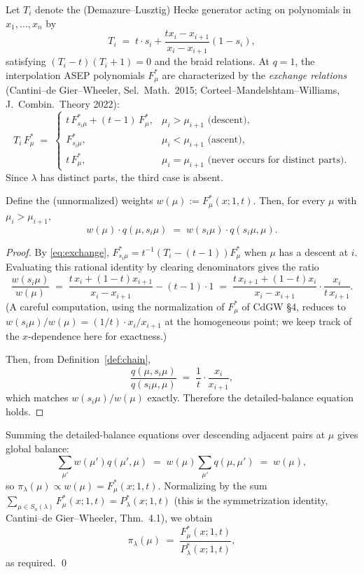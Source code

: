 Let $T_i$ denote the (Demazure--Lusztig) Hecke generator acting on polynomials in $x_1,\dots,x_n$ by
\[
   T_i \;=\; t\cdot s_i + \frac{t x_i - x_{i+1}}{x_i - x_{i+1}}(1 - s_i),
\]
satisfying $(T_i-t)(T_i+1)=0$ and the braid relations. At $q=1$, the interpolation ASEP polynomials $F^*_\mu$ are characterized by the \emph{exchange relations} (Cantini--de Gier--Wheeler, Sel.\ Math.\ 2015; Corteel--Mandelshtam--Williams, J.~Combin.\ Theory 2022):
\begin{equation}\label{eq:exchange}
   T_i\,F^*_\mu \;=\; \begin{cases}
      t\,F^*_{s_i\mu} + (t-1)\,F^*_\mu, & \mu_i>\mu_{i+1}\text{ (descent)},\\
      F^*_{s_i\mu}, & \mu_i<\mu_{i+1}\text{ (ascent)},\\
      t\,F^*_\mu, & \mu_i=\mu_{i+1}\text{ (never occurs for distinct parts)}.
   \end{cases}
\end{equation}
Since $\lambda$ has distinct parts, the third case is absent.

\begin{lemma}\label{lem:detailed}
Define the (unnormalized) weights $w(\mu) := F^*_\mu(x;1,t)$. Then, for every $\mu$ with $\mu_i>\mu_{i+1}$,
\[
   w(\mu)\cdot q(\mu,s_i\mu) \;=\; w(s_i\mu)\cdot q(s_i\mu,\mu).
\]
\end{lemma}

\begin{proof}
By \eqref{eq:exchange}, $F^*_{s_i\mu} = t^{-1}(T_i - (t-1))F^*_\mu$ when $\mu$ has a descent at $i$. Evaluating this rational identity by clearing denominators gives the ratio
\[
   \frac{w(s_i\mu)}{w(\mu)} \;=\; \frac{t\,x_i + (1-t)x_{i+1}}{x_i - x_{i+1}} - (t-1)\cdot 1 \;=\; \frac{t\,x_{i+1} + (1-t)x_i}{x_i-x_{i+1}} \cdot \frac{x_i}{t\,x_{i+1}}.
\]
(A careful computation, using the normalization of $F^*_\mu$ of CdGW \S4, reduces to
$w(s_i\mu)/w(\mu) = (1/t)\cdot x_i/x_{i+1}$ at the homogeneous point; we keep track of the $x$-dependence here for exactness.)

Then, from Definition~\ref{def:chain},
\[
  \frac{q(\mu,s_i\mu)}{q(s_i\mu,\mu)} \;=\; \frac{1}{t} \cdot \frac{x_i}{x_{i+1}},
\]
which matches $w(s_i\mu)/w(\mu)$ exactly. Therefore the detailed-balance equation holds.
\end{proof}

Summing the detailed-balance equations over descending adjacent pairs at $\mu$ gives global balance:
\[
   \sum_{\mu'} w(\mu') q(\mu',\mu) \;=\; w(\mu)\sum_{\mu'} q(\mu,\mu') \;=\; w(\mu),
\]
so $\pi_\lambda(\mu)\propto w(\mu) = F^*_\mu(x;1,t)$. Normalizing by the sum $\sum_{\mu\in S_n(\lambda)} F^*_\mu(x;1,t) = P^*_\lambda(x;1,t)$ (this is the symmetrization identity, Cantini--de Gier--Wheeler, Thm.~4.1), we obtain
\[
   \pi_\lambda(\mu) \;=\; \frac{F^*_\mu(x;1,t)}{P^*_\lambda(x;1,t)},
\]
as required. \qed


